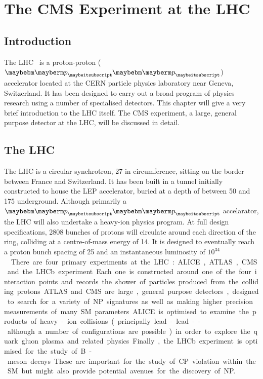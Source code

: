 \chapter{The \acl{CMS} Experiment at the \acl{LHC}}
\label{sec:experiment}
\section{Introduction}
The \acf{LHC}~\cite{lhc_design_report} is a proton-proton ($\Pp\Pp$) accelerator
located at the CERN particle physics laboratory near Geneva, Switzerland. It has
been designed to carry out a broad program of physics research using a number of
specialised detectors. This chapter will give a very brief introduction to the
\ac{LHC} itself. The \acf{CMS} experiment, a large, general purpose detector at
the \ac{LHC}, will be discussed in detail.

\section{The \acl{LHC}}
The \ac{LHC} is a circular synchrotron, \unit{27}{\kilo\metre} in circumference,
sitting on the border between France and Switzerland. It has been built in a
tunnel initially constructed to house the \ac{LEP} accelerator, buried at a
depth of between 50 and \unit{175}{\metre} underground. Although primarily a
$\Pp\Pp$ accelarator, the \ac{LHC} will also undertake a heavy-ion physics
program. At full design specifications, 2808 bunches of protons will circulate
around each direction of the ring, colliding at a centre-of-mass energy of
\unit{14}{\TeV}. It is designed to eventually reach a proton bunch spacing of
\unit{25}{\ns} and an instantaneous luminosity of
\unit{$10^{34}$}{\rpsquare{\centi\metre}\usk\reciprocal\second}.

There are four primary experiments at the LHC: \ac{ALICE}, \ac{ATLAS}, \ac{CMS}
and the \ac{LHCb} experiment. Each one is constructed around one of the four
interaction points and records the shower of particles produced from the
colliding protons. ATLAS and CMS are large, general purpose detectors, designed
to search for a variety of \ac{NP} signatures as well as making higher precision
measurements of many \ac{SM} parameters. \ac{ALICE} is optimised to examine the
products of heavy-ion collisions (principally lead-lead -- although a number of
configurations are possible) in order to explore the quark gluon plasma and
related physics. Finally, the \ac{LHCb} experiment is optimised for the study of
B-meson decays. These are important for the study of CP violation within the
\ac{SM} but might also provide potential avenues for the discovery of \ac{NP}.

